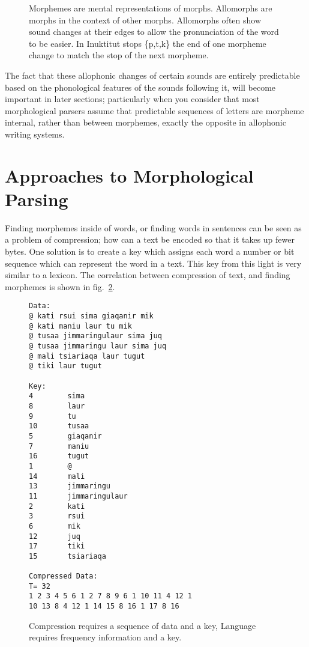 \documentclass[runningheads,a4paper]{llncs}
\begin{document}
\begin{figure}[htb]
	\caption{Morphemes are mental representations of morphs. Allomorphs are morphs in the context of other morphs. Allomorphs often show sound changes at their edges to allow the pronunciation of the word to be easier. In Inuktitut stops \{p,t,k\} the end of one morpheme change to match the stop of the next morpheme.}
	\label{fig:inuktitutallomorphy}
\end{figure}

The fact that these allophonic changes of certain sounds are entirely predictable based on the phonological features of the sounds following it, will become important in later sections; particularly when you consider that most morphological parsers assume that predictable sequences of letters are morpheme internal, rather than between morphemes, exactly the opposite in allophonic writing systems.



\section{Approaches to Morphological Parsing}
\label{approaches}
Finding morphemes inside of words, or finding words in sentences can be seen as a problem of compression;
 how can a text be encoded so that it takes up fewer bytes. One solution is to create a key which assigns each word a number or bit sequence which can represent the word in a  text. This key from this light is very similar to a lexicon. The correlation between compression of text, and finding morphemes is shown in fig.~\ref{fig:compression}.
 
 
\begin{figure}[htb]
\begin{verbatim}	
Data:
@ kati rsui sima giaqanir mik 
@ kati maniu laur tu mik 
@ tusaa jimmaringulaur sima juq 
@ tusaa jimmaringu laur sima juq 
@ mali tsiariaqa laur tugut 
@ tiki laur tugut 

Key:
4        sima
8        laur
9        tu
10       tusaa
5        giaqanir
7        maniu
16       tugut
1        @
14       mali
13       jimmaringu
11       jimmaringulaur
2        kati
3        rsui
6        mik
12       juq
17       tiki
15       tsiariaqa

Compressed Data:
T= 32
1 2 3 4 5 6 1 2 7 8 9 6 1 10 11 4 12 1 
10 13 8 4 12 1 14 15 8 16 1 17 8 16

\end{verbatim}
	
	
	\caption{Compression requires a sequence of data and a key, Language requires frequency information and a key.}
	\label{fig:compression}
\end{figure}
\end{document}
